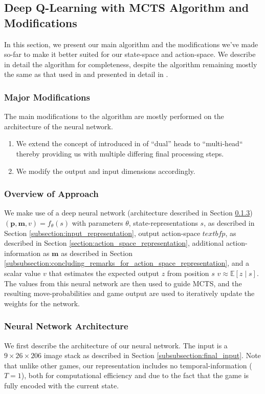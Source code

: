 \documentclass[12pt,twocolumn,letterpaper]{article}
\begin{document}
\subsection{Deep Q-Learning with MCTS Algorithm and Modifications}
\label{subsection:deep_qlearning_with_mcts_algorithm_and_modifications}
In this section, we present our main algorithm and the modifications we've made so-far to make it better suited for our state-space and action-space. We describe in detail the algorithm for completeness, despite the algorithm remaining mostly the same as that used in \cite{AlphaZero} and presented in detail in \cite{AlphaGoZero}.

\subsubsection{Major Modifications}
\label{subsubsection:major_modifications}
The main modifications to the algorithm are mostly performed on the architecture of the neural network. 
\begin{enumerate}
    \item We extend the concept of introduced in \cite{AlphaGoZero} of ``dual'' heads to ``multi-head`` thereby providing us with multiple differing final processing steps. 
    \item We modify the output and input dimensions accordingly.
\end{enumerate}

\subsubsection{Overview of Approach}
\label{subsubection:overview_of_approach}
We make use of a deep neural network (architecture described in Section \ref{subsubsection:neural_network_architecture}) $(\textbf{p}, \textbf{m}, v) = f_{\theta}(s)$ with parameters $\theta$, state-representations $s$, as described in Section \ref{subsection:input_representation}, output action-space $textbf{p}$, as described in Section \ref{section:action_space_representation}, additional action-information as $\textbf{m}$ as described in Section \ref{subsubsection:concluding_remarks_for_action_space_representation}, and a scalar value $v$ that estimates the expected output $z$ from position $s$ $v \approx \mathbb{E}[z \mid s]$. The values from this neural network are then used to guide MCTS, and the resulting move-probabilities and game output are used to iteratively update the weights for the network.

\subsubsection{Neural Network Architecture}
\label{subsubsection:neural_network_architecture}
We first describe the architecture of our neural network. The input is a $9 \times 26 \times 206$ image stack as described in Section \ref{subsubsection:final_input}. Note that unlike other games, our representation includes no temporal-information ($T = 1$), both for computational efficiency and due to the fact that the game is fully encoded with the current state. 
\end{document}
